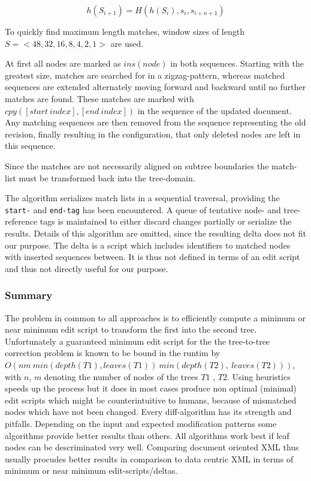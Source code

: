 \begin{equation}
h(S_{i+1}) = H(h(S_{i}), s_{i} , s_{i+n+1})
\end{equation}

To quickly find maximum length matches, window sizes of length $S = <48,32,16,8,4,2,1>$ are used.

At first all nodes are marked as $ins(node)$ in both sequences. Starting with the greatest size, matches are searched for in a zigzag-pattern, whereas matched sequences are extended alternately moving forward and backward until no further matches are found. These matches are marked with\\ $cpy([start\ index], [end\ index])$ in the sequence of the updated document. Any matching sequences are then removed from the sequence representing the old revision, finally resulting in the configuration, that only deleted nodes are left in this sequence.

Since the matches are not necessarily aligned on subtree boundaries the match-list must be transformed back into the tree-domain.

The algorithm serializes match lists in a sequential traversal, providing the \texttt{start-} and \texttt{end-tag} has been encountered. A queue of tentative node- and tree-reference tags is maintained to either discard changes partially or serialize the results. Details of this algorithm are omitted, since the resulting delta does not fit our purpose. The delta is a script which includes identifiers to matched nodes with inserted sequences between. It is thus not defined in terms of an edit script and thus not directly useful for our purpose.

\subsubsection{Summary}
The problem in common to all approaches is to efficiently compute a minimum or near minimum edit script to transform the first into the second tree. Unfortunately a guaranteed minimum edit script for the the tree-to-tree correction problem is known to be bound in the runtim by \\$O(nm\ min(depth(T1), leaves(T1))\ min(depth(T2),\ leaves(T2)))$, with $n$, $m$ denoting the number of nodes of the trees $T1$ , $T2$. Using heuristics speeds up the process but it does in most cases produce non optimal (minimal) edit scripts which might be counterintuitive to humans, because of mismatched nodes which have not been changed. Every diff-algorithm has its strength and pitfalls. Depending on the input and expected modification patterns some algorithms provide better results than others. All algorithms work best if leaf nodes can be descriminated very well. Comparing document oriented XML thus usually procudes better results in comparison to data centric XML in terms of minimum or near minimum edit-scripts/deltas.

